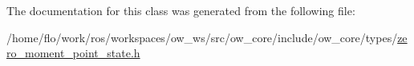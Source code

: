The documentation for this class was generated from the following file\+:\begin{DoxyCompactItemize}
\item 
/home/flo/work/ros/workspaces/ow\+\_\+ws/src/ow\+\_\+core/include/ow\+\_\+core/types/\hyperlink{zero__moment__point__state_8h}{zero\+\_\+moment\+\_\+point\+\_\+state.\+h}\end{DoxyCompactItemize}
